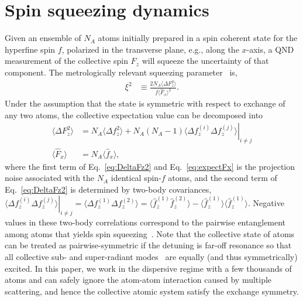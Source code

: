 \documentclass[aps,pra,twocolumn,superscriptaddress]{revtex4-1} %
\newcommand{\expect}[1]{\big\langle #1 \big\rangle}
\begin{document}
\section{Spin squeezing dynamics}

Given an ensemble of $N_A$ atoms initially prepared in a spin coherent state for the hyperfine spin $f$, polarized in the transverse plane, e.g., along the $x$-axis, a QND measurement of the collective spin  $F_z$ will squeeze the uncertainty of that component.  The metrologically relevant squeezing parameter~\cite{Wineland1992} is,
\begin{align}\label{eq:xi2Faraday}
\xi^2 &\equiv  \frac{2 N_A\expect{\Delta F_z ^2}}{f\expect{\hat{F}_x}^2}.
\end{align}
Under the assumption that the state is symmetric with respect to exchange of any two atoms, the collective expectation value can be decomposed into
\begin{subequations}\label{eq:Ftof_squeezing}
\begin{align}
\expect{\!\Delta F_z^2} &= N_A \expect{\!\Delta f_z^2}\!+\!N_A(N_A\!-\!1)\left. \expect{\!\Delta\! f_z^{(i)}\Delta\! f_z^{(j)}}\right|_{i\!\neq\! j}\label{eq:DeltaFz2}\\
\expect{\hat{F}_x } & =N_A \expect{\hat{f}_x},\label{eq:expectFx}
\end{align}
\end{subequations}
where the first term of Eq.~\eqref{eq:DeltaFz2} and Eq.~\eqref{eq:expectFx} is the projection noise associated with the  $N_A$ identical spin-$f$  atoms, and  the second term of Eq.~\eqref{eq:DeltaFz2} is determined by two-body covariances, $ \left.\expect{\Delta f_z^{(i)}\Delta f_z^{(j)}}\right|_{i\neq j}=\expect{\Delta f_z^{(1)}\Delta f_z^{(2)}} = \expect{\hat{f}_z^{(1)}\hat{f}_z^{(2)}}-\expect{\hat{f}_z^{(1)}} \expect{\hat{f}_z^{(1)}} $.  Negative values in these two-body correlations correspond to the pairwise entanglement among atoms that yields spin squeezing~\cite{Wang2003Spin}.  Note that the collective state of atoms can be treated as pairwise-symmetric if the detuning is far-off resonance so that all collective sub- and super-radiant modes~\cite{Asenjo-Garcia2017Atom,Asenjo-Garcia2017Exponential} are equally (and thus symmetrically) excited.  In this paper, we work in the dispersive regime with a few thousands of atoms and can safely ignore the atom-atom interaction caused by multiple scattering, and hence the collective atomic system satisfy the exchange symmetry.
\end{document}
